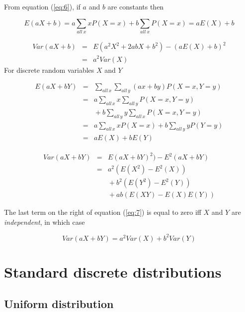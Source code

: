 \documentclass[a5paper]{article}
\begin{document}
From equation (\ref{eq:6}), if $a$ and $b$ are constants then

\begin{equation}
  E(aX + b) = a\sum_{all\ x}xP(X\!=\!x)+ b\sum_{all\ x}P(X\!=\!x)  = aE(X) + b
\end{equation}

\begin{eqnarray}
  Var(aX + b) &=& E(a^2X^2 + 2abX + b^2) - (aE(X) + b)^2 \nonumber\\
  &=& a^2Var(X)
\end{eqnarray}
\noindent For discrete random variables $X$ and $Y$

\begin{eqnarray}
  E(aX + bY) & = & \sum_{all\,x}\sum_{all\,y}(ax + by)P(X\!=\!x,Y\!=\!y)\nonumber\\
  & = & a\sum_{all\,x}x\sum_{all\,y}P(X\!=\!x,Y\!=\!y)\nonumber\\
  & & \mbox{} + b\sum_{all\,y}y\sum_{all\,x} P(X\!=\!x,Y\!=\!y)\nonumber\\
  & = & a\sum_{all\,x}xP(X\!=\!x) + b\sum_{all\,y}yP(Y\!=\!y)\nonumber\\
  & = & aE(X) + bE(Y)
\end{eqnarray}

\begin{eqnarray} \label{eq:7}
  Var(aX + bY) & = & E(aX + bY)^2) - E^2(aX + bY) \nonumber\\
  &=& a^2(E(X^2) - E^2(X)) \nonumber\\
  & & \mbox{} + b^2(E(Y^2) - E^2(Y)) \nonumber\\
  & & \mbox{} + ab(E(XY) - E(X)E(Y))
\end{eqnarray}

\noindent The last term on the right of equation (\ref{eq:7}) is equal to zero
iff $X$ and $Y$ are \textit{independent}, in which case

\begin{equation}
  Var(aX + bY) = a^2Var(X) + b^2Var(Y)
\end{equation}

\section{Standard discrete distributions}

\subsection{Uniform distribution}
\end{document}
